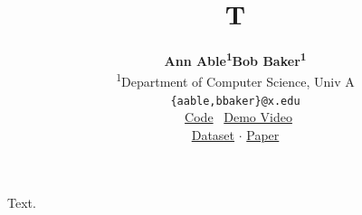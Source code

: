 \documentclass{article}
\title{T}
\author{\textbf{Ann Able\textsuperscript{1}}\quad \textbf{Bob Baker\textsuperscript{1}}\\ \textsuperscript{1}Department of Computer Science, Univ A \\ \texttt{\{aable,bbaker\}@x.edu} \\ \faGithub~\href{https://github.com/a/b}{Code}\hspace{1.5em} \yticon~\href{https://www.youtube.com/watch?v=7}{Demo Video} \\ \href{https://x.org/data}{Dataset} $\cdot$ \href{https://x.org/paper}{Paper}}
\begin{document}
\maketitle
Text.
\end{document}
